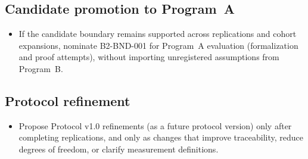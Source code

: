 \subsection{Candidate promotion to Program~A}
\begin{itemize}
  \item If the candidate boundary remains supported across replications and cohort expansions, nominate B2-BND-001 for Program~A evaluation (formalization and proof attempts), without importing unregistered assumptions from Program~B.
\end{itemize}

\subsection{Protocol refinement}
\begin{itemize}
  \item Propose Protocol v1.0 refinements (as a future protocol version) only after completing replications, and only as changes that improve traceability, reduce degrees of freedom, or clarify measurement definitions.
\end{itemize}
